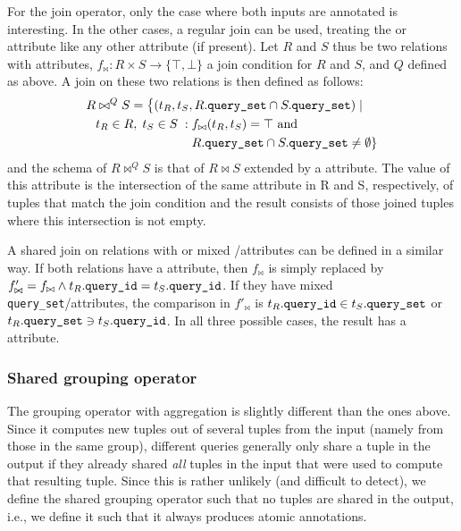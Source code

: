 For the join operator, only the case
where both inputs are annotated is interesting.
In the other cases, a regular join can be used,
treating the \qid or \qset attribute like any other attribute (if present).
Let $R$ and $S$ thus be two relations with \qset attributes,
$f_{\bowtie} : R \times S \rightarrow \{\top,\bot\}$ a join condition for $R$ and $S$,
and $Q$ defined as above.
A join on these two relations is then defined as follows:
%
{
\begin{equation}
  \begin{alignedat}{3}
        R & \bowtie^Q S = \big\{ \rlap{$(t_R, t_S, R.\text{\qset} \cap S.\text{\qset} ) \; |$} && \\
        & t_R \in R, \; t_S \in S \; : \; && f_{\bowtie}(t_R, t_S) = \top \text{~and~} \\
        &                                 && R.\text{\qset} \cap S.\text{\qset} \neq \emptyset \}
  \end{alignedat}
  \label{eqn:shared_join}
\end{equation}
}
%
and the schema of $R \bowtie^Q S$ is that of $R \bowtie S$
extended by a \qset attribute.
The value of this attribute is the intersection
of the same attribute in R and S, respectively,
of tuples that match the join condition
and the result consists of those joined tuples
where this intersection is not empty.

A shared join on relations with \qid or mixed \qset/\allowbreak \qid attributes
can be defined in a similar way.
If both relations have a \qid attribute,
then $f_{\bowtie}$ is simply replaced by
\mbox{$f'_{\bowtie} = f_{\bowtie} \wedge t_R.\text{{\texttt{query\_id}}} = t_S.\text{{\texttt{query\_id}}}$}.
If they have mixed \texttt{query\_\allowbreak set}/\qid attributes,
the comparison in $f'_{\bowtie}$
is $t_R.\text{{\texttt{query\_id}}} \in\allowbreak t_S.\text{\texttt{query\_set}}$ or $t_R.\text{\texttt{query\_set}} \ni t_S.\text{{\texttt{query\_id}}}$.
In all three possible cases, the result has a \qid attribute.

\subsubsection{Shared grouping operator}
\label{sec:shared_groupby_op}

The grouping operator with aggregation
is slightly different than the ones above.
Since it computes new tuples out of several tuples from the input
(namely from those in the same group),
different queries generally only share a tuple in the output
if they already shared \emph{all} tuples in the input
that were used to compute that resulting tuple.
Since this is rather unlikely (and difficult to detect),
we define the shared grouping operator
such that no tuples are shared in the output,
i.e., we define it such that it always produces atomic \qid annotations.


